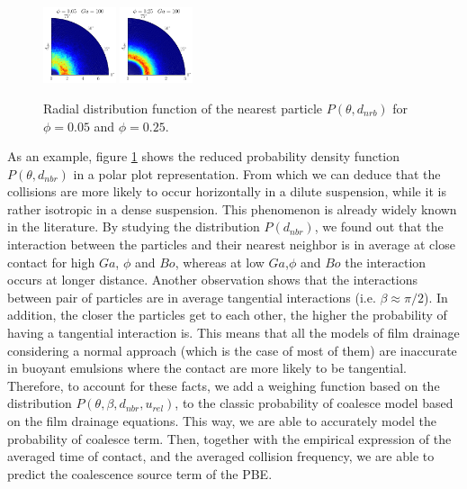 \documentclass[twocolumn,a4paper,10pt]{scrartcl}
\begin{document}
\begin{figure}
    \centering
    \includegraphics[width =0.19\textwidth]{image/N_10/beta/2DMAP_theta_distmin_dmin_10_Bo1PHI0_05mu_r0_42Ga100.pdf}
    \includegraphics[width =0.19\textwidth]{image/N_10/beta/2DMAP_theta_distmin_dmin_10_Bo1PHI0_25mu_r0_42Ga100.pdf}
    \caption{Radial distribution function of the nearest particle $P(\theta,d_{nrb})$ for $\phi=0.05$ and $\phi=0.25$.}
    \label{fig:icmf}
\end{figure}
As an example, figure \ref{fig:icmf} shows the reduced probability density function $P(\theta,d_{nbr})$ in a polar plot representation.
From which we can deduce that the collisions are more likely to occur horizontally in a dilute suspension, while it is rather isotropic in a dense suspension. 
This phenomenon is already widely known in the literature.
By studying the distribution $P(d_{nbr})$, we found out that the interaction between the particles and their nearest neighbor is in average at close contact for high $Ga$, $\phi$ and $Bo$, whereas at low $Ga$,$\phi$ and $Bo$ the interaction occurs at longer distance. 
Another observation shows that the interactions between pair of particles are in average tangential interactions (i.e. $\beta \approx \pi/2$). 
In addition, the closer the particles get to each other, the higher the probability of having a tangential interaction is. 
This means that all the models of film drainage considering a normal approach (which is the case of most of them) are inaccurate in buoyant emulsions where the contact are more likely to be tangential. 
Therefore, to account for these facts, we add a weighing function based on the distribution $P(\theta,\beta,d_{nbr},u_{rel})$, to the classic probability of coalesce model based on the film drainage equations. 
This way, we are able to accurately model the probability of coalesce term. 
Then, together with the empirical expression of the averaged time of contact, and the averaged collision frequency, we are able to predict the coalescence source term of the PBE. 
\end{document}
